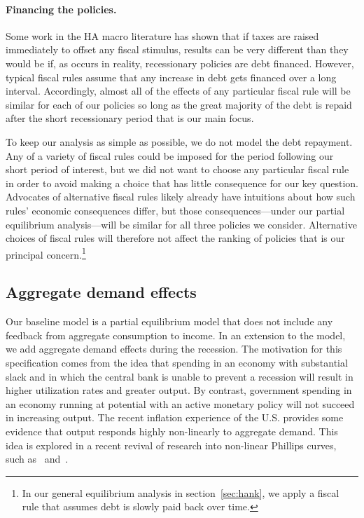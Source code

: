 \documentclass[\latexroot/\projectname]{subfiles}
\begin{document}
\paragraph{Financing the policies.} Some work in the HA macro literature has shown that if taxes are raised immediately to offset any fiscal stimulus, results can be very different than they would be if, as occurs in reality, recessionary policies are debt financed.
However, typical fiscal rules assume that any increase in debt gets financed over a long interval.
Accordingly, almost all of the effects of any particular fiscal rule will be  similar for each of our policies so long as the great majority of the debt is repaid after the short recessionary period that is our main focus.

To keep our analysis as simple as possible, we do not model the debt repayment.
Any of a variety of fiscal rules could be imposed for the period following our short period of interest, but we did not want to choose any particular fiscal rule in order to avoid making a choice that has little consequence for our key question.
Advocates of alternative fiscal rules likely already have intuitions about how such rules' economic consequences differ, but those consequences---under our partial equilibrium analysis---will be similar for all three policies we consider.
Alternative choices of fiscal rules will therefore not affect the ranking of policies that is our principal concern.\footnote{In our general equilibrium analysis in section~\ref{sec:hank}, we apply a fiscal rule that assumes debt is slowly paid back over time.}

\subsection{Aggregate demand effects}\whenintegrated{\label{aggregate-demand-effects}}
\whenintegrated{\label{sec:ADeffects}} 

Our baseline model is a partial equilibrium model that does not include any feedback from aggregate consumption to income.
In an extension to the model, we add aggregate demand effects during the recession.
The motivation for this specification comes from the idea that spending in an economy with substantial slack and in which the central bank is unable to prevent a recession will result in higher utilization rates and greater output.
By contrast, government spending in an economy running at potential with an active monetary policy will not succeed in increasing output.
The recent inflation experience of the U.S.
provides some evidence that output responds highly non-linearly to aggregate demand.
This idea is explored in a recent revival of research into non-linear Phillips curves, such as~\cite{benigno2023baaack} and~\cite{blanco2024nonlinear}.
\end{document}
